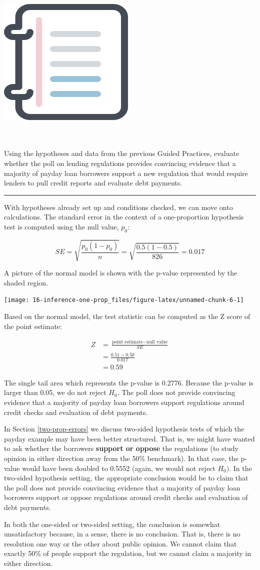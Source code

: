 \documentclass[
  10pt,
  openany]{book}
\newenvironment{mdframedwithfootGPWE}
{   
    \savenotes
    \begin{mdframed}[%
    topline=true, bottomline=true, linecolor=oiB, linewidth=0.5pt,
    rightline=false, leftline=false,
    backgroundcolor=oiLGray]
    \renewcommand{\thempfootnote}{\arabic{footnote}}
    }
{
    \end{mdframed}
    \spewnotes
}
\newenvironment{workedexample}{
    \let\oldrule\rule
    \renewcommand{\rule}[2]{\vspace{-2mm}\oldrule{##1}{##2}\vspace{-2mm}}
\vspace{4mm}
\begin{mdframedwithfootGPWE}
\begin{minipage}[t]{0.10\textwidth}
{$\:$ \\ \setkeys{Gin}{width=2.5em,keepaspectratio}\includegraphics{images/_icons/worked-example.png}}
\end{minipage}
\hfill
\begin{minipage}[t]{0.90\textwidth}
\vspace{-2mm}
\setlength{\parskip}{1em}
\noindent\textbf{\color{oiB}\small\fontfamily{phv}\selectfont{\MakeUppercase{Example}}} $\:$ \\ \\
}{\end{minipage}
\end{mdframedwithfootGPWE}
\vspace{4mm}
}
\begin{document}
\begin{workedexample}
Using the hypotheses and data from the previous Guided Practices, evaluate whether the poll on lending regulations provides convincing evidence that a majority of payday loan borrowers support a new regulation that would require lenders to pull credit reports and evaluate debt payments.

\begin{center}\rule{0.5\linewidth}{0.5pt}\end{center}

With hypotheses already set up and conditions checked, we can move onto calculations.
The standard error in the context of a one-proportion hypothesis test is computed using the null value, \(p_0:\)

\[SE = \sqrt{\frac{p_0 (1 - p_0)}{n}} = \sqrt{\frac{0.5 (1 - 0.5)}{826}} = 0.017\]

A picture of the normal model is shown with the p-value represented by the shaded region.

\begin{center}\texttt{[image: 16-inference-one-prop\_files/figure-latex/unnamed-chunk-6-1]} \end{center}

Based on the normal model, the test statistic can be computed as the Z score of the point estimate:

\[
\begin{aligned}
Z &= \frac{\text{point estimate} - \text{null value}}{SE} \\
  &= \frac{0.51 - 0.50}{0.017} \\
  &= 0.59
\end{aligned} 
\]

The single tail area which represents the p-value is 0.2776.
Because the p-value is larger than 0.05, we do not reject \(H_0.\) The poll does not provide convincing evidence that a majority of payday loan borrowers support regulations around credit checks and evaluation of debt payments.

In Section \ref{two-prop-errors} we discuss two-sided hypothesis tests of which the payday example may have been better structured.
That is, we might have wanted to ask whether the borrowers \textbf{support or oppose} the regulations (to study opinion in either direction away from the 50\% benchmark).
In that case, the p-value would have been doubled to 0.5552 (again, we would not reject \(H_0).\) In the two-sided hypothesis setting, the appropriate conclusion would be to claim that the poll does not provide convincing evidence that a majority of payday loan borrowers support or oppose regulations around credit checks and evaluation of debt payments.

In both the one-sided or two-sided setting, the conclusion is somewhat unsatisfactory because, in a sense, there is no conclusion.
That is, there is no resolution one way or the other about public opinion.
We cannot claim that exactly 50\% of people support the regulation, but we cannot claim a majority in either direction.

\end{workedexample}
\end{document}
